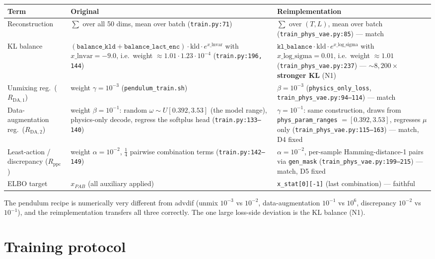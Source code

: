 \documentclass[11pt,a4paper]{article}
\newcommand{\code}[1]{\texttt{#1}}
\begin{document}
\begin{table}[h]
\centering
\small
\begin{tabularx}{\textwidth}{LXX}
\toprule
\textbf{Term} & \textbf{Original} & \textbf{Reimplementation} \\
\midrule
Reconstruction & $\sum$ over all 50 dims, mean over batch (\code{train.py:71}) & $\sum$ over $(T, L)$, mean over batch (\code{train\_phys\_vae.py:85}) --- match \\
KL balance & $(\code{balance\_kld} + \code{balance\_lact\_enc}) \cdot \mathrm{kld} \cdot e^{x\_\mathrm{lnvar}}$ with $x\_\mathrm{lnvar} = -9.0$, i.e.\ weight $\approx 1.01 \cdot 1.23 \cdot 10^{-4}$ (\code{train.py:196, 144}) & $\code{kl\_balance} \cdot \mathrm{kld} \cdot e^{x\_\mathrm{log\_sigma}}$ with $x\_\mathrm{log\_sigma} = 0.01$, i.e.\ weight $\approx 1.01$ (\code{train\_phys\_vae.py:237}) --- \textbf{$\sim 8{,}200\times$ stronger KL} (N1) \\
Unmixing reg.\ ($R_{\mathrm{DA},1}$) & weight $\gamma = 10^{-3}$ (\code{pendulum\_train.sh}) & $\beta = 10^{-3}$ (\code{physics\_only\_loss}, \code{train\_phys\_vae.py:94--114}) --- match \\
Data-augmentation reg.\ ($R_{\mathrm{DA},2}$) & weight $\beta = 10^{-1}$: random $\omega \sim U[0.392, 3.53]$ (the model range), physics-only decode, regress the softplus head (\code{train.py:133--140}) & $\gamma = 10^{-1}$: same construction, draws from \code{phys\_param\_ranges} $= [0.392, 3.53]$, regresses $\mu$ only (\code{train\_phys\_vae.py:115--163}) --- match, D4 fixed \\
Least-action / discrepancy ($R_\mathrm{ppc}$) & weight $\alpha = 10^{-2}$, $\tfrac14$ pairwise combination terms (\code{train.py:142--149}) & $\alpha = 10^{-2}$, per-sample Hamming-distance-1 pairs via \code{gen\_mask} (\code{train\_phys\_vae.py:199--215}) --- match, D5 fixed \\
ELBO target & $x_{PAB}$ (all auxiliary applied) & \code{x\_stat[0][-1]} (last combination) --- faithful \\
\bottomrule
\end{tabularx}
\end{table}

\noindent The pendulum recipe is numerically very different from advdif
(unmix $10^{-3}$ vs $10^{-2}$, data-augmentation $10^{-1}$ vs $10^{6}$,
discrepancy $10^{-2}$ vs $10^{-1}$), and the reimplementation transfers all
three correctly. The one large loss-side deviation is the KL balance (N1).

\section{Training protocol}
\label{sec:protocol}
\end{document}
